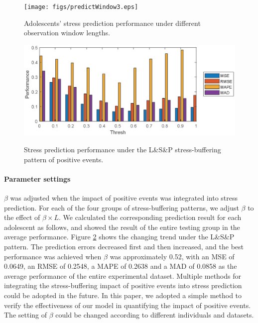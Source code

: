 \begin{figure}
\centering
\caption{\small{Adolescents' stress prediction performance under different observation window lengths.}}
\texttt{[image: figs/predictWindow3.eps]}
\label{fig:length}
\end{figure}

\begin{figure}
\centering
\caption{\small{Stress prediction performance under the L\&S\&P stress-buffering pattern of positive events.}}
\includegraphics[width=\linewidth]{figs/thresh.eps}
\label{fig:thresh}
\end{figure}

\paragraph{Parameter settings}
$\beta$ was adjusted when the impact of positive events was integrated into stress prediction.
For each of the four groups of stress-buffering patterns,
we adjust $\beta$ to the effect of $\beta \times L$.
We calculated the corresponding prediction result for each adolescent as follows,
and showed the result of the entire testing group in the average performance.
Figure \ref{fig:thresh} shows the changing trend under the L\&S\&P pattern.
The prediction errors decreased first and then increased,
and the best performance was achieved when $\beta$ was
approximately 0.52, with an MSE of 0.0649, an RMSE of 0.2548,
a MAPE of 0.2638 and a MAD of 0.0858 as the average performance of the entire experimental dataset.
Multiple methods for integrating the stress-buffering impact of positive events into stress prediction could be adopted in the future.
In this paper,
we adopted a simple method to verify the effectiveness of our model in quantifying the impact of positive events.
The setting of $\beta$ could be changed according to different individuals and datasets.
